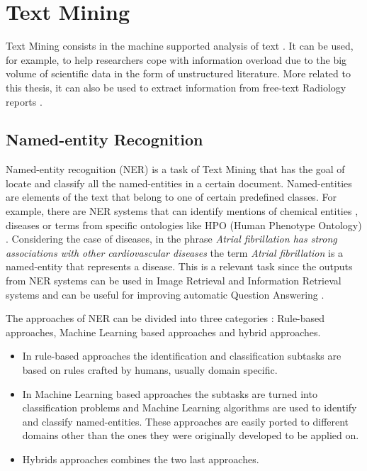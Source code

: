 \label{chap2}


\section{Text Mining}

Text Mining consists in the machine supported analysis of text \citep{Hotho2005}. It can be used, for example, to help researchers cope with information overload \citep{Cohen2005a} due to the big volume of scientific data in the form of unstructured literature. More related to this thesis, it can also be used to extract information from free-text Radiology reports \citep{Pons2016}.

\subsection{Named-entity Recognition}
\label{Named-entity Recognition}

Named-entity recognition (NER) is a task of Text Mining that has the goal of locate and classify all the named-entities in a certain document. Named-entities are elements of the text that belong to one of certain predefined classes. For example, there are NER systems that can identify mentions of chemical entities \citep{Zhang2016}, diseases \citep{Wei2016} or terms from specific ontologies like HPO (Human Phenotype Ontology) \citep{Groza2015}. Considering the case of diseases, in the phrase \textit{Atrial fibrillation has strong associations with other cardiovascular diseases} the term \textit{Atrial fibrillation} is a named-entity that represents a disease. This is a relevant task since the outputs from NER systems can be used in Image Retrieval \citep{Gerstmair2012} and Information Retrieval \citep{Antony2015} systems and can be useful for improving automatic Question Answering \citep{Toral2005}.

The approaches of NER can be divided into three categories \citep{Mohit2014}: Rule-based approaches, Machine Learning based approaches and hybrid approaches.

\begin{itemize}
\item In rule-based approaches the identification and classification subtasks are based on rules crafted by humans, usually domain specific.
\item In Machine Learning based approaches the subtasks are turned into classification problems and Machine Learning algorithms are used to identify and classify named-entities. These approaches are easily ported to different domains other than the ones they were originally developed to be applied on.
\item Hybrids approaches combines the two last approaches.
\end{itemize}

